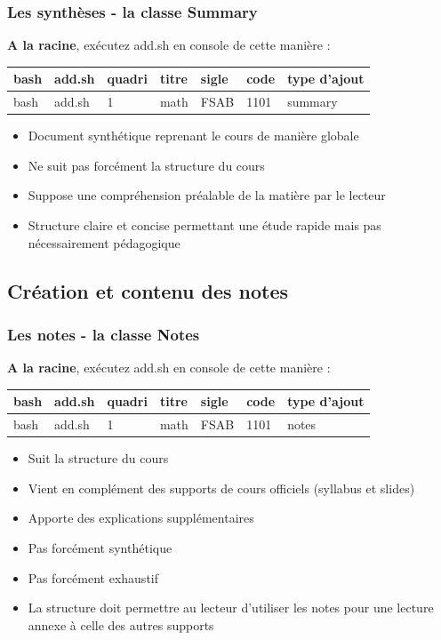 \documentclass{beamer}
\begin{document}
\begin{frame}
    \frametitle{Les synthèses - la classe Summary}
    \begin{exampleblock}{\textbf{A la racine}, exécutez add.sh en
    console de cette manière :}
       \begin{tabular}{lllllll}
           bash & add.sh & quadri & titre & sigle & code & type d'ajout
           \\ \hline
           bash & add.sh & 1 & math & FSAB & 1101 & summary \\
       \end{tabular}
    \end{exampleblock}
    \bigskip

    \begin{itemize}
        \item Document synthétique reprenant le cours de manière globale
        \item Ne suit pas forcément la structure du cours
        \item Suppose une compréhension préalable de la matière par le
            lecteur
        \item Structure claire et concise permettant une étude rapide
            mais pas nécessairement pédagogique
    \end{itemize}
\end{frame}

\subsection{Création et contenu des notes}

\begin{frame}
    \frametitle{Les notes - la classe Notes}
    \begin{exampleblock}{\textbf{A la racine}, exécutez add.sh en
    console de cette manière :}
       \begin{tabular}{lllllll}
           bash & add.sh & quadri & titre & sigle & code & type d'ajout
           \\ \hline
           bash & add.sh & 1 & math & FSAB & 1101 & notes \\
       \end{tabular}
    \end{exampleblock}
    \bigskip

    \begin{itemize}
        \item Suit la structure du cours
        \item Vient en complément des supports de cours officiels
            (syllabus et slides)
        \item Apporte des explications supplémentaires
        \item Pas forcément synthétique
        \item Pas forcément exhaustif
        \item La structure doit permettre au lecteur d'utiliser les
            notes pour une lecture annexe à celle des autres supports
    \end{itemize}
\end{frame}
\end{document}
